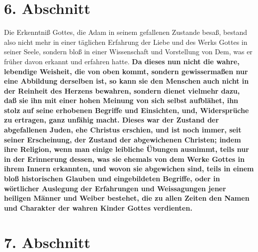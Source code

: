 \section{6. Abschnitt} \label{kap7_ab6}

Die Erkenntniß Gottes, die Adam in seinem gefallenen Zustande besaß, bestand
also nicht mehr in einer täglichen Erfahrung der Liebe und des Werks Gottes in
seiner Seele, sondern bloß in einer Wissenschaft und Vorstellung von Dem, was er
früher davon erkannt und erfahren hatte. \textbf{Da dieses nun nicht die wahre,
lebendige Weisheit, die von oben kommt, sondern gewissermaßen nur eine Abbildung
derselben ist, so kann sie den Menschen auch nicht in der Reinheit des Herzens
bewahren, sondern dienet vielmehr dazu, daß sie ihn mit einer hohen Meinung von
sich selbst aufblähet, ihn stolz auf seine erhobenen Begriffe und Einsichten, und, Widersprüche zu ertragen, ganz unfähig macht. Dieses war der Zustand der
abgefallenen Juden, ehe Christus erschien, und ist noch immer, seit seiner
Erscheinung, der Zustand der abgewichenen Christen; indem ihre Religion, wenn
man einige leibliche Übungen ausnimmt, teils nur in der Erinnerung dessen, was
sie ehemals von dem Werke Gottes in ihrem Innern erkannten, und wovon sie
abgewichen sind, teils in einem bloß historischen Glauben und eingebildeten
Begriffe, oder in wörtlicher Auslegung  der Erfahrungen und Weissagungen jener
heiligen Männer und Weiber bestehet, die zu allen Zeiten den Namen und Charakter
der wahren Kinder Gottes verdienten.}

\section{7. Abschnitt} \label{kap7_ab7}

